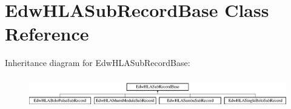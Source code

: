 \hypertarget{class_edw_h_l_a_sub_record_base}{
\section{EdwHLASubRecordBase Class Reference}
\label{class_edw_h_l_a_sub_record_base}
}
Inheritance diagram for EdwHLASubRecordBase:\begin{figure}[H]
\begin{center}
\leavevmode
\includegraphics[height=1.35922cm]{class_edw_h_l_a_sub_record_base}
\end{center}
\end{figure}
